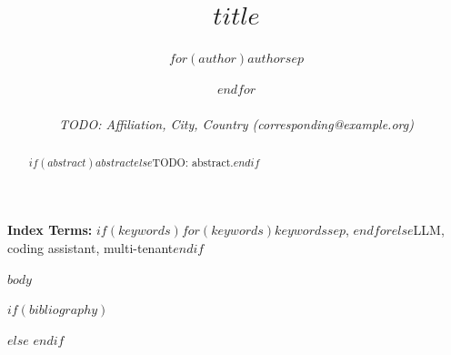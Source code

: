 \documentclass[10pt,a4paper]{article}
\title{$title$}
\author{$for(author)$$author$$sep$ \and $endfor$\\\\\small\textit{TODO: Affiliation, City, Country (corresponding@example.org)}}
\begin{document}
\maketitle

\begin{abstract}
$if(abstract)$$abstract$$else$TODO: abstract.$endif$
\end{abstract}

\noindent\textbf{Index Terms:}
$if(keywords)$$for(keywords)$$keywords$$sep$, $endfor$$else$LLM, coding assistant, multi-tenant$endif$\par
\vspace{0.5em}

$body$


$if(bibliography)$

$else$
$endif$
\end{document}
